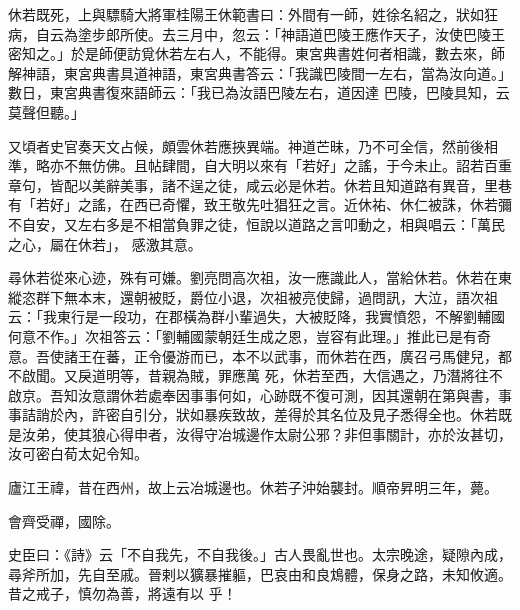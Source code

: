 \begin{pinyinscope}
 休若既死，上與驃騎大將軍桂陽王休範書曰：外間有一師，姓徐名紹之，狀如狂病，自云為塗步郎所使。去三月中，忽云：「神語道巴陵王應作天子，汝使巴陵王密知之。」於是師便訪覓休若左右人，不能得。東宮典書姓何者相識，數去來，師解神語，東宮典書具道神語，東宮典書答云：「我識巴陵間一左右，當為汝向道。」數日，東宮典書復來語師云：「我已為汝語巴陵左右，道因達
 巴陵，巴陵具知，云莫聲但聽。」



 又頃者史官奏天文占候，頗雲休若應挾異端。神道芒昧，乃不可全信，然前後相準，略亦不無仿佛。且帖肆間，自大明以來有「若好」之謠，于今未止。詔若百重章句，皆配以美辭美事，諸不逞之徒，咸云必是休若。休若且知道路有異音，里巷有「若好」之謠，在西已奇懼，致王敬先吐猖狂之言。近休祐、休仁被誅，休若彌不自安，又左右多是不相當負罪之徒，恒說以道路之言叩動之，相與唱云：「萬民之心，屬在休若」，
 感激其意。



 尋休若從來心迹，殊有可嫌。劉亮問高次祖，汝一應識此人，當給休若。休若在東縱恣群下無本末，還朝被貶，爵位小退，次祖被亮使歸，過問訊，大泣，語次祖云：「我東行是一段功，在郡橫為群小輩過失，大被貶降，我實憤怨，不解劉輔國何意不作。」次祖答云：「劉輔國蒙朝廷生成之恩，豈容有此理。」推此已是有奇意。吾使諸王在蕃，正令優游而已，本不以武事，而休若在西，廣召弓馬健兒，都不啟聞。又戾道明等，昔親為賊，罪應萬
 死，休若至西，大信遇之，乃潛將往不啟京。吾知汝意謂休若處奉因事事何如，心跡既不復可測，因其還朝在第與書，事事詰誚於內，許密自引分，狀如暴疾致故，差得於其名位及見子悉得全也。休若既是汝弟，使其狼心得申者，汝得守冶城邊作太尉公邪？非但事關計，亦於汝甚切，汝可密白荀太妃令知。



 廬江王禕，昔在西州，故上云冶城邊也。休若子沖始襲封。順帝昇明三年，薨。



 會齊受禪，國除。



 史臣曰：《詩》云「不自我先，不自我後。」古人畏亂世也。太宗晚途，疑隙內成，尋斧所加，先自至戚。晉剌以獷暴摧軀，巴哀由和良鴆體，保身之路，未知攸適。昔之戒子，慎勿為善，將遠有以
 乎！



\end{pinyinscope}